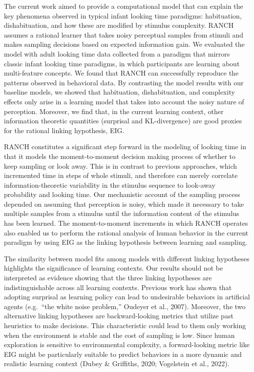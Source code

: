 \documentclass[10pt, letterpaper]{article}
\begin{document}
The current work aimed to provide a computational model that can explain
the key phenomena observed in typical infant looking time paradigms:
habituation, dishabituation, and how these are modified by stimulus
complexity. RANCH assumes a rational learner that takes noisy perceptual
samples from stimuli and makes sampling decisions based on expected
information gain. We evaluated the model with adult looking time data
collected from a paradigm that mirrors classic infant looking time
paradigms, in which participants are learning about multi-feature
concepts. We found that RANCH can successfully reproduce the patterns
observed in behavioral data. By contrasting the model results with our
baseline models, we showed that habituation, dishabituation, and
complexity effects only arise in a learning model that takes into
account the noisy nature of perception. Moreover, we find that, in the
current learning context, other information theoretic quantities
(surprisal and KL-divergence) are good proxies for the rational linking
hypothesis, EIG.

RANCH constitutes a significant step forward in the modeling of looking
time in that it models the moment-to-moment decision making process of
whether to keep sampling or look away. This is in contrast to previous
approaches, which incremented time in steps of whole stimuli, and
therefore can merely correlate information-theoretic variability in the
stimulus sequence to look-away probability and looking time. Our
mechanistic account of the sampling process depended on assuming that
perception is noisy, which made it necessary to take multiple samples
from a stimulus until the information content of the stimulus has been
learned. The moment-to-moment increments in which RANCH operates also
enabled us to perform the rational analysis of human behavior in the
current paradigm by using EIG as the linking hypothesis between learning
and sampling.

The similarity between model fits among models with different linking
hypotheses highlights the significance of learning contexts. Our results
should not be interpreted as evidence showing that the three linking
hypotheses are indistinguishable across all learning contexts. Previous
work has shown that adopting surprisal as learning policy can lead to
undesirable behaviors in artificial agents (e.g.~``the white noise
problem,'' Oudeyer et al., 2007). Moreover, the two alternative linking
hypotheses are backward-looking metrics that utilize past heuristics to
make decisions. This characteristic could lead to them only working when
the environment is stable and the cost of sampling is low. Since human
exploration is sensitive to environmental complexity, a forward-looking
metric like EIG might be particularly suitable to predict behaviors in a
more dynamic and realistic learning context (Dubey \& Griffiths, 2020;
Vogelstein et al., 2022).
\end{document}
